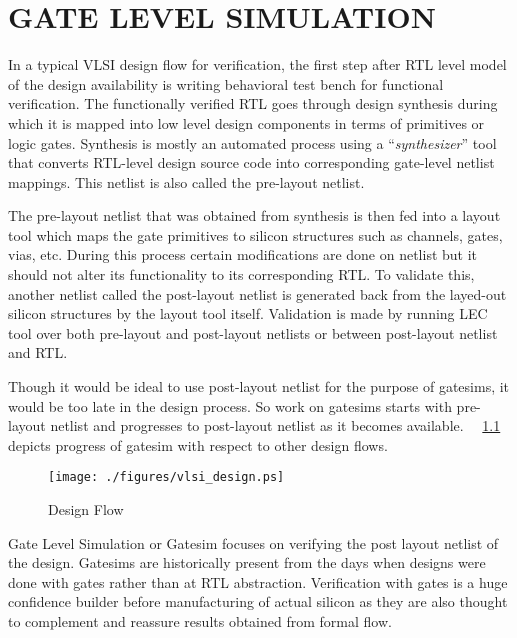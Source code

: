 \chapter{GATE LEVEL SIMULATION}
\label{chap:gate_intro.tex}

In a typical VLSI design flow for verification, the first step after RTL level model of the design availability is writing behavioral test bench for functional verification. The functionally verified RTL goes through design synthesis during which it is mapped into low level design components in terms of primitives or logic gates. Synthesis is mostly an automated process using a ``{\it synthesizer}'' tool that converts RTL-level design source code into corresponding gate-level netlist mappings. This netlist is also called the pre-layout netlist.

The pre-layout netlist that was obtained from synthesis is then fed into a layout tool which maps the gate primitives to silicon structures such as channels, gates, vias, etc. During this process certain modifications are done on netlist but it should not alter its functionality to its corresponding RTL. To validate this, another netlist called the post-layout netlist is generated back from the layed-out silicon structures by the layout tool itself. Validation is made by running LEC tool over both pre-layout and post-layout netlists or between post-layout netlist and RTL.

Though it would be ideal to use post-layout netlist for the purpose of gatesims, it would be too late in the design process. So work on gatesims starts with pre-layout netlist and progresses to post-layout netlist as it becomes available. ~\figurename{~\ref{fig:vlsi_design.ps}} depicts progress of gatesim with respect to other design flows.

\begin{figure}[h]
\centering
\texttt{[image: ./figures/vlsi\_design.ps]}
\caption{Design Flow}
\label{fig:vlsi_design.ps}
\end{figure}
Gate Level Simulation or Gatesim focuses on verifying the post layout netlist of the design. Gatesims are historically present from the days when designs were done with gates rather than at RTL abstraction. Verification with gates is a huge confidence builder before manufacturing of actual silicon as they are also thought to complement and reassure results obtained from formal flow.


